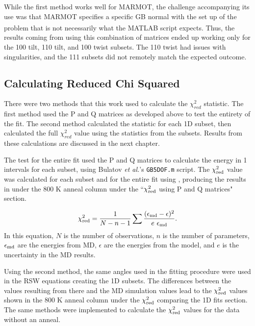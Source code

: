 \documentclass[twoside,senior]{BYUPhys}
\begin{document}
While the first method works well for MARMOT, the challenge accompanying its use was that MARMOT specifies a specific GB normal with the set up of the problem that is not necessarily what the MATLAB\textsuperscript{\textregistered} script expects.  Thus, the results coming from using this combination of matrices ended up working only for the \textlangle{}100\textrangle{} tilt, \textlangle{}110\textrangle{} tilt, and \textlangle{}100\textrangle{} twist subsets. The \textlangle{}110\textrangle{} twist had issues with singularities, and the \textlangle{}111\textrangle{} subsets did not remotely match the expected outcome.

\subsection{Calculating Reduced Chi Squared\label{chi2:chi2red}}
There were two methods that this work used to calculate the $\chi^2_{red}$ statistic.  The first method used the P and Q matrices as developed above to test the entirety of the fit.  The second method calculated the statistic for each 1D subset, then calculated the full $\chi^2_{red}$ value using the statistics from the subsets.  Results from these calculations are discussed in the next chapter.

The test for the entire fit used the P and Q matrices to calculate the energy in 1\textdegree{} intervals for each subset, using Bulatov \emph{et al.}'s \lstinline!GB5DOF.m! script.  The $\chi_{\textnormal{red}}^2$ value was calculated for each subset and for the entire fit using , producing the results in  under the 800 K anneal column under the ``$\chi_{\textnormal{red}}^2$ using P and Q matrices" section.

\begin{equation}
\label{eq:chi2}
\chi^2_{\textnormal{red}} = \frac{1}{N-n-1} \sum \frac{(\epsilon_{\textnormal{md}} - \epsilon)^2}{e\ \epsilon_{\textnormal{md}}}.
\end{equation}
In this equation, $N$ is the number of observations, $n$ is the number of parameters, $\epsilon_{\textnormal{md}}$ are the energies from MD, $\epsilon$ are the energies from the model, and $e$ is the uncertainty in the MD results.

Using the second method, the same angles used in the fitting procedure were used in the RSW equations creating the 1D subsets.  The differences between the values resulting from there and the MD simulation values lead to the $\chi_{\textnormal{red}}^2$ values shown in the 800 K anneal column under the $\chi_{\textnormal{red}}^2$ comparing the 1D fits section.  The same methods were implemented to calculate the $\chi_{\textnormal{red}}^2$ values for the data without an anneal.
\end{document}
